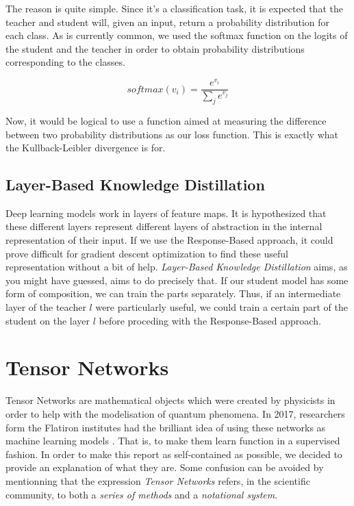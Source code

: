 \documentclass{article}
\theoremstyle{definition}
\theoremstyle{definition}
\begin{document}
The reason is quite simple. Since it's a classification task, it is expected that the teacher and student will, given an input, return a probability distribution for each class. As is currently common, we used the softmax function on the logits of the student and the teacher in order to obtain probability distributions corresponding to the classes. 

\begin{equation}
    softmax(v_i) = \frac{e^{v_i}}{\sum_{j}{e^{v_j}}}
\end{equation}

Now, it would be logical to use a function aimed at measuring the difference between two probability distributions as our loss function. This is exactly what the Kullback-Leibler divergence is for.

\subsection{Layer-Based Knowledge Distillation}
Deep learning models work in layers of feature maps. It is hypothesized that
these different layers represent different layers of abstraction in the internal
representation of their input. If we use the Response-Based approach, it could prove difficult for gradient descent optimization to find these useful representation without a bit of help. {\it Layer-Based Knowledge Distillation} aims, as you might have guessed, aims to do precisely that. If our student model has some form of composition, we can train the parts separately. Thus, if an intermediate layer of the teacher $l$ were particularly useful, we could train a certain part of the student on the layer $l$ before proceding with the Response-Based approach.



\section{Tensor Networks}
Tensor Networks are mathematical objects which were created by physicists in order to help with the modelisation of quantum phenomena.
In 2017, researchers form the Flatiron institutes had the brilliant idea of using these networks as machine learning models \cite{stoudenmire2017supervised}. That is, to make them learn function in a supervised fashion. In order to make this report as self-contained as possible, we decided to provide an explanation of what they are. Some confusion can be avoided by mentionning that the expression \emph{Tensor Networks} refers, in the scientific community, to both a \emph{series of methods} and a \emph{notational system}.
\end{document}

